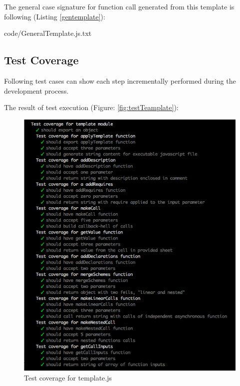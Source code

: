 {The general case signature for function call generated from this template is following (Listing \ref{gentemplate}):

{code/GeneralTemplate.js.txt}

\subsection{Test Coverage}
Following test cases can show each step incrementally performed during the development process.

%

The result of test execution (Figure: \ref{fig:testTeamplate}):
\begin{figure}[H]
	\centering
	\includegraphics[width=\linewidth]{grafiken/testTemplate.png}
	\caption{Test coverage for template.js}
	\label{fig:testTemplate}
\end{figure}

}

